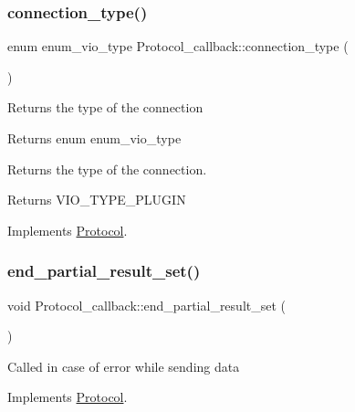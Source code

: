 \subsubsection{\texorpdfstring{connection\+\_\+type()}{connection\_type()}}
{\footnotesize\ttfamily enum enum\+\_\+vio\+\_\+type Protocol\+\_\+callback\+::connection\+\_\+type (\begin{DoxyParamCaption}{ }\end{DoxyParamCaption})\hspace{0.3cm}{\ttfamily [virtual]}}

Returns the type of the connection

\begin{DoxyReturn}{Returns}
enum enum\+\_\+vio\+\_\+type
\end{DoxyReturn}
Returns the type of the connection.

\begin{DoxyReturn}{Returns}
V\+I\+O\+\_\+\+T\+Y\+P\+E\+\_\+\+P\+L\+U\+G\+IN 
\end{DoxyReturn}


Implements \mbox{\hyperlink{classProtocol}{Protocol}}.

\mbox{\label{classProtocol__callback_a5991f22647e032d05be2cb72e81ce5b6}} 
\subsubsection{\texorpdfstring{end\+\_\+partial\+\_\+result\+\_\+set()}{end\_partial\_result\_set()}}
{\footnotesize\ttfamily void Protocol\+\_\+callback\+::end\+\_\+partial\+\_\+result\+\_\+set (\begin{DoxyParamCaption}{ }\end{DoxyParamCaption})\hspace{0.3cm}{\ttfamily [virtual]}}

Called in case of error while sending data 

Implements \mbox{\hyperlink{classProtocol}{Protocol}}.

\mbox{\label{classProtocol__callback_a5df97b8f8dbf62682cfc4e79b76ae1ea}} 
